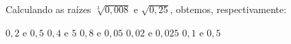 Calculando as raízes $\sqrt[3]{0{,}008}$ e $\sqrt{0{,}25}$, obtemos, respectivamente:

$0{,}2$ e $0{,}5$
$0{,}4$ e $5$
$0{,}8$ e $0{,}05$
$0{,}02$ e $0{,}025$
$0{,}1$ e $0{,}5$



